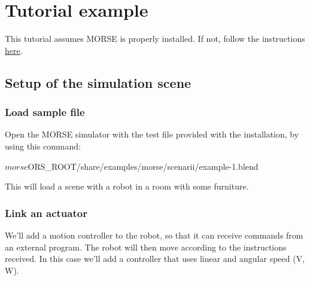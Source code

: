 \documentclass[twoside,a4paper,10pt]{report}
\newcommand{\dokutitlelevelone}[1]{\chapter{#1}}
\newcommand{\dokutitleleveltwo}[1]{\section{#1}}
\newcommand{\dokutitleleveltree}[1]{\subsection{#1}}
\begin{document}
\dokutitlelevelone{Tutorial example}
\label{d0e1bed8b40ec8e4f9cc0cc0a11ff110}%
\label{0575c8d592fb7b088226750aceec2b4e}%

This tutorial assumes MORSE is properly installed. If not, follow the instructions \hyperref[ea09bb364ef1bffd889e76b7a59035fc]{ here}.


\dokutitleleveltwo{Setup of the simulation scene}
\label{80527725485ea9e7bedbc9d918895a02}%

\dokutitleleveltree{Load sample file}
\label{4238ab1e3d8f80f2fdec7f34e17e0f67}%

Open the MORSE simulator with the test file provided with the installation, by using this command:



\small
\begin{verbatimtab}
$ morse $ORS_ROOT/share/examples/morse/scenarii/example-1.blend
\end{verbatimtab}
\normalsize

This will load a scene with a robot in a room with some furniture.


\dokutitleleveltree{Link an actuator}
\label{81c6b973417d3e5000d27d9c1c805b96}%

We'll add a motion controller to the robot, so that it can receive commands from an external program. The robot will then move according to the instructions received. In this case we'll add a controller that uses linear and angular speed (V, W).
\end{document}

